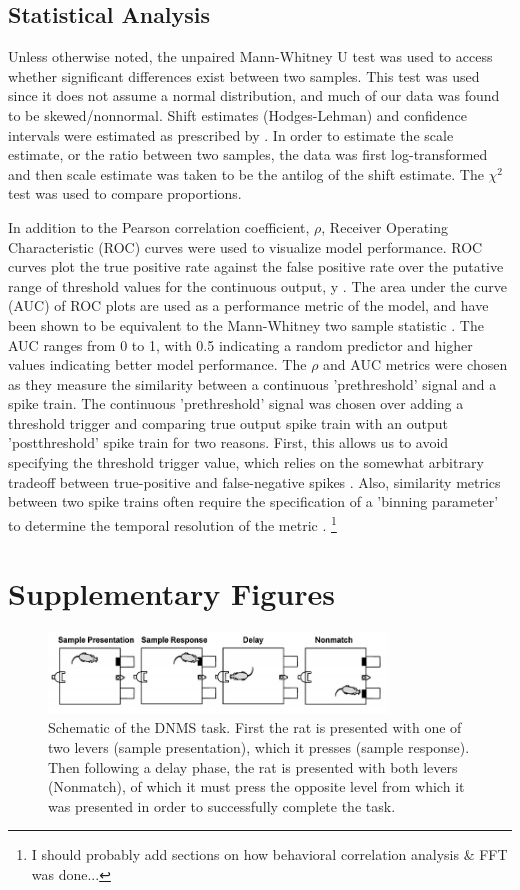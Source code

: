 \documentclass[11pt,a4paper,final]{article}
\begin{document}
    \subsection{Statistical Analysis}
Unless otherwise noted, the unpaired Mann-Whitney U test was used to access whether significant differences exist between two samples. This test was used since it does not assume a normal distribution, and much of our data was found to be skewed/nonnormal. Shift estimates (Hodges-Lehman) and confidence intervals were estimated as prescribed by \citet{higgins93}. In order to estimate the scale estimate, or the ratio between two samples, the data was first log-transformed and then scale estimate was taken to be the antilog of the shift estimate. The $\chi^2$ test was used to compare proportions.

In addition to the Pearson correlation coefficient, $\rho$, Receiver Operating Characteristic (ROC) curves were used to visualize model performance. ROC curves plot the true positive rate against the false positive rate over the putative range of threshold values for the continuous output, y \citep{zanos08}. The area under the curve (AUC) of ROC plots are used as a performance metric of the model, and have been shown to be equivalent to the Mann-Whitney two sample statistic \citep{hanely1982}. The AUC ranges from 0 to 1, with 0.5 indicating a random predictor and higher values indicating better model performance. The $\rho$ and AUC metrics were chosen as they measure the similarity between a continuous 'prethreshold' signal and a spike train. The continuous 'prethreshold' signal was chosen over adding a threshold trigger and comparing true output spike train with an output 'postthreshold' spike train for two reasons. First, this allows us to avoid specifying the threshold trigger value, which relies on the somewhat arbitrary tradeoff between true-positive and false-negative spikes \citep{marm13}. Also, similarity metrics between two spike trains often require the specification of a 'binning parameter' to determine the temporal resolution of the metric \citep{vanrossum01,victor97}.
\footnote{I should probably add sections on how behavioral correlation analysis \& FFT was done...}


\section{Supplementary Figures \label{SF}}

\begin{figure}[!ht]
\centering
\includegraphics[width=90mm]{DNMS}
\caption[DNMS Task Schematic]{
Schematic of the DNMS task. First the rat is presented with one of two levers (sample presentation), which it presses (sample response). Then following a delay phase, the rat is presented with both levers (Nonmatch), of which it must press the opposite level from which it was presented in order to successfully complete the task. }
\label{DNMS}
\end{figure}
\end{document}
